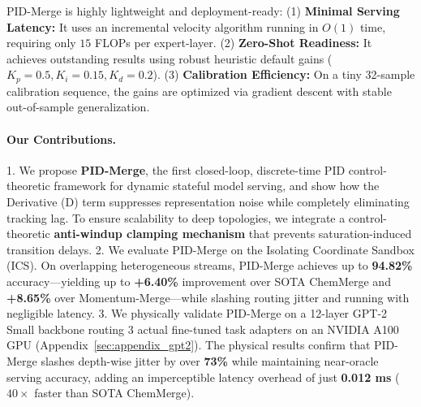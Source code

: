 PID-Merge is highly lightweight and deployment-ready: (1) \textbf{Minimal Serving Latency:} It uses an incremental velocity algorithm running in $O(1)$ time, requiring only $15$ FLOPs per expert-layer. (2) \textbf{Zero-Shot Readiness:} It achieves outstanding results using robust heuristic default gains ($K_p = 0.5, K_i = 0.15, K_d = 0.2$). (3) \textbf{Calibration Efficiency:} On a tiny 32-sample calibration sequence, the gains are optimized via gradient descent with stable out-of-sample generalization.

\paragraph{Our Contributions.}
1. We propose \textbf{PID-Merge}, the first closed-loop, discrete-time PID control-theoretic framework for dynamic stateful model serving, and show how the Derivative (D) term suppresses representation noise while completely eliminating tracking lag. To ensure scalability to deep topologies, we integrate a control-theoretic \textbf{anti-windup clamping mechanism} that prevents saturation-induced transition delays.
2. We evaluate PID-Merge on the Isolating Coordinate Sandbox (ICS). On overlapping heterogeneous streams, PID-Merge achieves up to \textbf{94.82\%} accuracy—yielding up to \textbf{+6.40\%} improvement over SOTA ChemMerge and \textbf{+8.65\%} over Momentum-Merge—while slashing routing jitter and running with negligible latency.
3. We physically validate PID-Merge on a 12-layer GPT-2 Small backbone routing 3 actual fine-tuned task adapters on an NVIDIA A100 GPU (Appendix~\ref{sec:appendix_gpt2}). The physical results confirm that PID-Merge slashes depth-wise jitter by over \textbf{73\%} while maintaining near-oracle serving accuracy, adding an imperceptible latency overhead of just \textbf{0.012 ms} ($40\times$ faster than SOTA ChemMerge).
